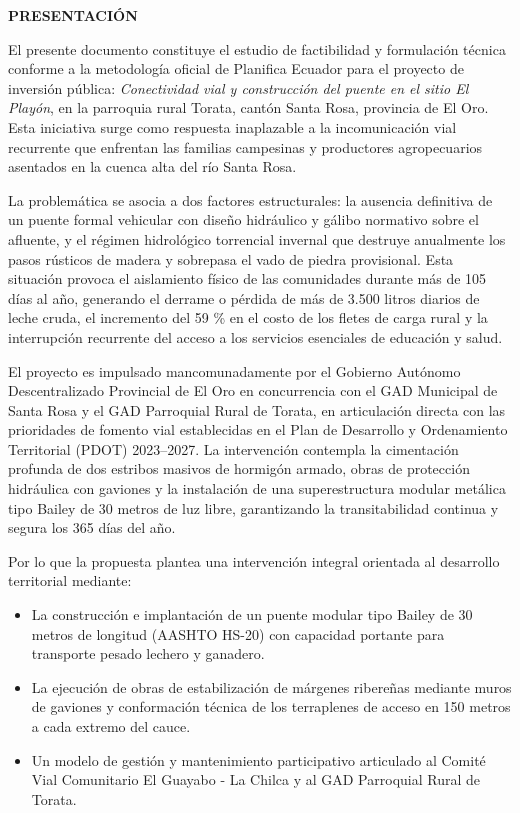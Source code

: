 \newpage
\thispagestyle{fancy}

\begin{center}
  {\bfseries\large PRESENTACIÓN}
\end{center}

\vspace{0.15cm}

\begingroup
\justifying
\fontsize{9.5pt}{13.2pt}\selectfont

El presente documento constituye el estudio de factibilidad y formulación técnica conforme a la metodología oficial de Planifica Ecuador para el proyecto de inversión pública: \textit{Conectividad vial y construcción del puente en el sitio El Playón}, en la parroquia rural Torata, cantón Santa Rosa, provincia de El Oro. Esta iniciativa surge como respuesta inaplazable a la incomunicación vial recurrente que enfrentan las familias campesinas y productores agropecuarios asentados en la cuenca alta del río Santa Rosa.

La problemática se asocia a dos factores estructurales: la ausencia definitiva de un puente formal vehicular con diseño hidráulico y gálibo normativo sobre el afluente, y el régimen hidrológico torrencial invernal que destruye anualmente los pasos rústicos de madera y sobrepasa el vado de piedra provisional. Esta situación provoca el aislamiento físico de las comunidades durante más de 105 días al año, generando el derrame o pérdida de más de 3.500 litros diarios de leche cruda, el incremento del 59 \% en el costo de los fletes de carga rural y la interrupción recurrente del acceso a los servicios esenciales de educación y salud.

El proyecto es impulsado mancomunadamente por el Gobierno Autónomo Descentralizado Provincial de El Oro en concurrencia con el GAD Municipal de Santa Rosa y el GAD Parroquial Rural de Torata, en articulación directa con las prioridades de fomento vial establecidas en el Plan de Desarrollo y Ordenamiento Territorial (PDOT) 2023--2027. La intervención contempla la cimentación profunda de dos estribos masivos de hormigón armado, obras de protección hidráulica con gaviones y la instalación de una superestructura modular metálica tipo Bailey de 30 metros de luz libre, garantizando la transitabilidad continua y segura los 365 días del año.

Por lo que la propuesta plantea una intervención integral orientada al desarrollo territorial mediante:
\begin{itemize}\setlength\itemsep{-0.2em}\setlength\parskip{0pt}
  \item La construcción e implantación de un puente modular tipo Bailey de 30 metros de longitud (AASHTO HS-20) con capacidad portante para transporte pesado lechero y ganadero.
  \item La ejecución de obras de estabilización de márgenes ribereñas mediante muros de gaviones y conformación técnica de los terraplenes de acceso en 150 metros a cada extremo del cauce.
  \item Un modelo de gestión y mantenimiento participativo articulado al Comité Vial Comunitario El Guayabo - La Chilca y al GAD Parroquial Rural de Torata.
\end{itemize}


